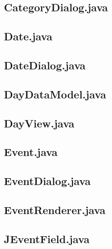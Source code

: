 \documentclass{article}
\begin{document}


\subsection{CategoryDialog.java}



\subsection{Date.java}



\subsection{DateDialog.java}



\subsection{DayDataModel.java}



\subsection{DayView.java}



\subsection{Event.java}



\subsection{EventDialog.java}



\subsection{EventRenderer.java}



\subsection{JEventField.java}
\end{document}
